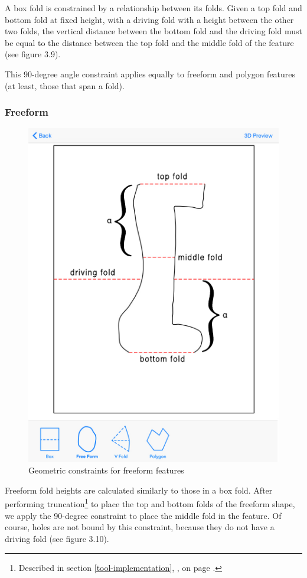A box fold is constrained by a relationship between its folds. Given a
top fold and bottom fold at fixed height, with a driving fold with a
height between the other two folds, the vertical distance between the
bottom fold and the driving fold must be equal to the distance between
the top fold and the middle fold of the feature (see figure 3.9).

This 90-degree angle constraint applies equally to freeform and polygon
features (at least, those that span a fold).

\subsubsection{Freeform}\label{freeform}

\begin{figure}[htbp]
\centering
\includegraphics{figures/45_Tech_Constraints/freeformConstraints.pdf}
\caption{Geometric constraints for freeform features}
\end{figure}

Freeform fold heights are calculated similarly to those in a box fold.
After performing truncation\footnote{Described in section
  \ref{tool-implementation}, , on page
  \pageref{tool-implementation}.} to place the top and bottom folds of
the freeform shape, we apply the 90-degree constraint to place the
middle fold in the feature. Of course, holes are not bound by this
constraint, because they do not have a driving fold (see figure 3.10).

